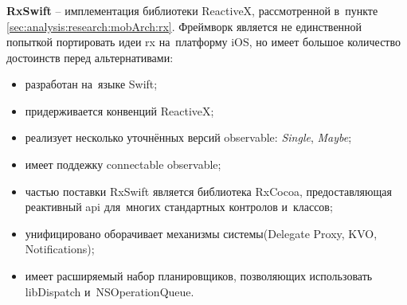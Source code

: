 \subsubsection{}
\label{sec:development:arch:ios:rxswift}

\textbf{RxSwift} -- имплементация библиотеки ReactiveX, рассмотренной в~пункте \ref{sec:analysis:research:mobArch:rx}. Фреймворк является не единственной попыткой портировать идеи \gls{rx} на~платформу iOS, но имеет большое количество достоинств перед альтернативами:

\begin{itemize}
	\item разработан на~языке Swift;
	\item придерживается конвенций ReactiveX;
	\item реализует несколько уточнённых версий \gls{observable}: \textit{Single}, \textit{Maybe};
	\item имеет поддежку connectable \gls{observable};
	\item частью поставки RxSwift является библиотека RxCocoa, предоставляющая реактивный \gls{api} для~многих стандартных контролов и~классов;
	\item унифицировано оборачивает механизмы системы(Delegate Proxy, KVO, Notifications);
	\item имеет расширяемый набор планировщиков, позволяющих использовать libDispatch и~NSOperationQueue.
\end{itemize}